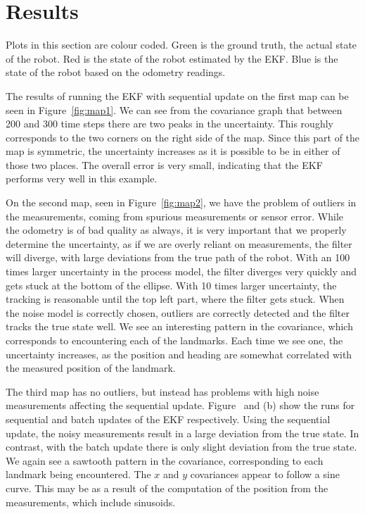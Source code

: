\documentclass[a4paper,12pt]{article}
\begin{document}
\section{Results}
Plots in this section are colour coded. Green is the ground truth, the actual
state of the robot. Red is the state of the robot estimated by the EKF. Blue is
the state of the robot based on the odometry readings.

The results of running the EKF with sequential update on the first map can be
seen in Figure~\ref{fig:map1}. We can see from the covariance graph that between
200 and 300 time steps there are two peaks in the uncertainty. This roughly
corresponds to the two corners on the right side of the map. Since this part of
the map is symmetric, the uncertainty increases as it is possible to be in
either of those two places. The overall error is very small, indicating that the
EKF performs very well in this example.

On the second map, seen in Figure~\ref{fig:map2}, we have the problem of
outliers in the measurements, coming from spurious measurements or sensor
error. While the odometry is of bad quality as always, it is very important that
we properly determine the uncertainty, as if we are overly reliant on
measurements, the filter will diverge, with large deviations from the true path
of the robot. With an 100 times larger uncertainty in the process model, the
filter diverges very quickly and gets stuck at the bottom of the ellipse. With
10 times larger uncertainty, the tracking is reasonable until the top left part,
where the filter gets stuck. When the noise model is correctly chosen, outliers
are correctly detected and the filter tracks the true state well. We see an
interesting pattern in the covariance, which corresponds to encountering each of
the landmarks. Each time we see one, the uncertainty increases, as the position
and heading are somewhat correlated with the measured position of the landmark.

The third map has no outliers, but instead has problems with high noise
measurements affecting the sequential update. Figure~ and (b)
show the runs for sequential and batch updates of the EKF respectively. Using
the sequential update, the noisy measurements result in a large deviation from
the true state. In contrast, with the batch update there is only slight
deviation from the true state. We again see a sawtooth pattern in the
covariance, corresponding to each landmark being encountered. The $x$ and $y$
covariances appear to follow a sine curve. This may be as a result of the
computation of the position from the measurements, which include sinusoids.
\end{document}

